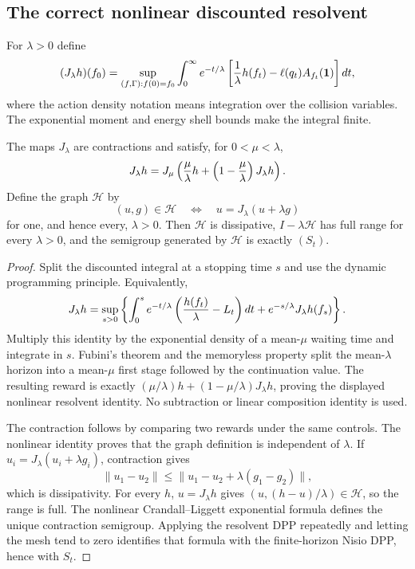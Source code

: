 \subsection{The correct nonlinear discounted resolvent}

For $\lambda>0$ define
\[
 (J_\lambda h)(f_0)=
 \sup_{(f,\Gamma):f(0)=f_0}
 \int_0^\infty e^{-t/\lambda}
 \left[{1\over\lambda}h(f_t)-
       \ell(q_t)A_{f_t}(\mathbf1)\right]dt,
\]
where the action density notation means integration over the collision
variables.  The exponential moment and energy shell bounds make the integral
finite.

\begin{theorem}
\label{thm:r21-b4-resolvent}
The maps $J_\lambda$ are contractions and satisfy, for
$0<\mu<\lambda$,
\[
 J_\lambda h
 =J_\mu\left({\mu\over\lambda}h+
          \left(1-{\mu\over\lambda}\right)J_\lambda h\right).
\]
Define the graph $\mathcal H$ by
\[
 (u,g)\in\mathcal H
 \quad\Longleftrightarrow\quad
 u=J_\lambda(u+\lambda g)
\]
for one, and hence every, $\lambda>0$.  Then $\mathcal H$ is dissipative,
$I-\lambda\mathcal H$ has full range for every $\lambda>0$, and the semigroup
generated by $\mathcal H$ is exactly $(S_t)$.
\end{theorem}

\begin{proof}
Split the discounted integral at a stopping time $s$ and use the dynamic
programming principle.  Equivalently,
\[
 J_\lambda h=\sup_{s>0}
 \left\{\int_0^se^{-t/\lambda}
  \left({h(f_t)\over\lambda}-L_t\right)dt
  +e^{-s/\lambda}J_\lambda h(f_s)\right\}.
\]
Multiply this identity by the exponential density of a mean-$\mu$ waiting
time and integrate in $s$.  Fubini's theorem and the memoryless property split
the mean-$\lambda$ horizon into a mean-$\mu$ first stage followed by the
continuation value.  The resulting reward is exactly
$(\mu/\lambda)h+(1-\mu/\lambda)J_\lambda h$, proving the displayed nonlinear
resolvent identity.  No subtraction or linear composition identity is used.

The contraction follows by comparing two rewards under the same controls.
The nonlinear identity proves that the graph definition is independent of
$\lambda$.  If $u_i=J_\lambda(u_i+\lambda g_i)$, contraction gives
\[
 \|u_1-u_2\|\le
 \|u_1-u_2+\lambda(g_1-g_2)\|,
\]
which is dissipativity.  For every $h$, $u=J_\lambda h$ gives
$(u,(h-u)/\lambda)\in\mathcal H$, so the range is full.  The nonlinear
Crandall--Liggett exponential formula defines the unique contraction semigroup.
Applying the resolvent DPP repeatedly and letting the mesh tend to zero
identifies that formula with the finite-horizon Nisio DPP, hence with $S_t$.
\end{proof}

